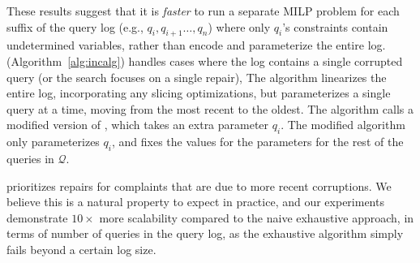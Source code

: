 These results suggest that it is \emph{faster} to run a separate MILP problem for each 
suffix of the query log (e.g., $q_i, q_{i+1}\ldots, q_n$) where only $q_i$'s constraints contain
undetermined variables, rather than encode and parameterize the entire log.
\incremental (Algorithm~\ref{alg:incalg}) handles cases where the log contains a single corrupted query (or the search focuses on a single repair),
The algorithm linearizes the entire log, incorporating any slicing optimizations, but parameterizes a single query at a time, moving from the most recent to the oldest.
The algorithm calls a modified version of \naive,
which takes an extra parameter $q_i$.  The modified algorithm only parameterizes $q_i$, 
and fixes the values for the parameters for the rest of the queries in $\mathcal{Q}$.




\incremental prioritizes repairs for complaints that are due to more recent corruptions.
We believe this is a natural property to expect in practice, and our experiments demonstrate $10\times$
more scalability compared to the naive exhaustive approach, in terms of number of queries in the query log, as the exhaustive algorithm simply fails beyond a certain log size.

